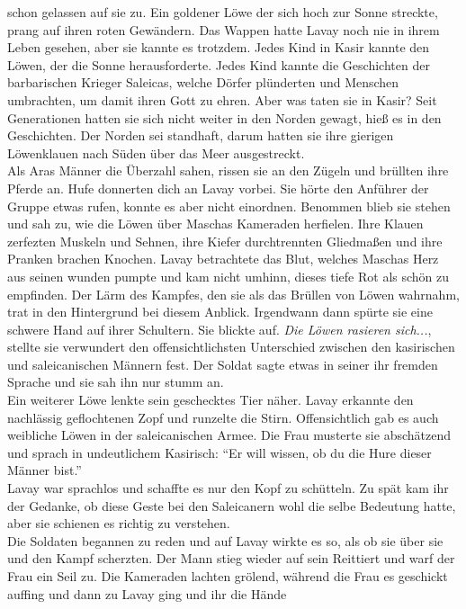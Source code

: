 schon gelassen auf sie zu. Ein goldener Löwe der sich hoch zur Sonne streckte, prang auf ihren 
roten 
Gewändern. Das Wappen hatte Lavay noch nie in ihrem Leben gesehen, aber sie kannte es trotzdem. 
Jedes Kind in Kasir kannte den Löwen, der die Sonne herausforderte. Jedes Kind kannte die 
Geschichten der barbarischen Krieger Saleicas, welche Dörfer plünderten und Menschen umbrachten, um 
damit ihren Gott zu ehren. Aber was taten sie in Kasir? Seit Generationen hatten sie sich nicht 
weiter in den Norden gewagt, hieß es in den Geschichten. Der Norden sei standhaft, darum hatten sie 
ihre gierigen Löwenklauen nach Süden über das Meer ausgestreckt.\\
Als Aras Männer die Überzahl sahen, rissen sie an den Zügeln und brüllten ihre Pferde an. Hufe 
donnerten dich an Lavay vorbei. Sie hörte den Anführer der Gruppe etwas rufen, konnte es aber nicht 
einordnen. Benommen blieb sie stehen und sah zu, wie die Löwen über Maschas Kameraden herfielen. 
Ihre Klauen zerfezten Muskeln und Sehnen, ihre Kiefer durchtrennten Gliedmaßen und ihre Pranken 
brachen Knochen. Lavay betrachtete das Blut, welches Maschas Herz aus seinen wunden pumpte und kam 
nicht umhinn, dieses tiefe Rot als schön zu empfinden. Der Lärm des Kampfes, den sie als das 
Brüllen von Löwen wahrnahm, trat in den Hintergrund bei diesem Anblick. Irgendwann dann spürte sie 
eine schwere Hand auf ihrer Schultern. Sie blickte auf. \textit{Die Löwen rasieren sich...}, 
stellte sie verwundert den offensichtlichsten Unterschied zwischen den kasirischen und 
saleicanischen Männern fest. Der Soldat sagte etwas in seiner ihr fremden Sprache und sie sah ihn 
nur stumm an.\\
Ein weiterer Löwe lenkte sein geschecktes Tier näher. Lavay erkannte den nachlässig geflochtenen 
Zopf und runzelte die Stirn. Offensichtlich gab es auch weibliche Löwen in der saleicanischen 
Armee. Die Frau musterte sie abschätzend und sprach in undeutlichem Kasirisch: ``Er will wissen, ob 
du die Hure dieser Männer bist.''\\
Lavay war sprachlos und schaffte es nur den Kopf zu schütteln. Zu spät kam ihr der Gedanke, ob 
diese Geste bei den Saleicanern wohl die selbe Bedeutung hatte, aber sie schienen es richtig zu 
verstehen.\\
Die Soldaten begannen zu reden und auf Lavay wirkte es so, als ob sie über sie und den Kampf 
scherzten. Der Mann stieg wieder auf sein Reittiert und warf der Frau ein Seil zu. Die Kameraden 
lachten grölend, während die Frau es geschickt auffing und dann zu Lavay ging und ihr die Hände 
